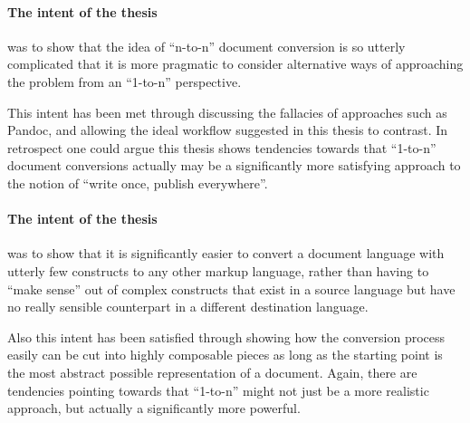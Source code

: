 \documentclass{scrreprt}
\begin{document}
\paragraph{The intent of the thesis}
was to show that the idea of ``n-to-n'' document conversion is so utterly complicated that it is more pragmatic to consider alternative ways of approaching the problem from an ``1-to-n'' perspective.

This intent has been met through discussing the fallacies of approaches such as Pandoc\footnotePandoc{}, and allowing the ideal workflow suggested in this thesis to contrast. In retrospect one could argue this thesis shows tendencies towards that ``1-to-n'' document conversions actually may be a significantly more satisfying approach to the notion of ``write once, publish everywhere''.


\paragraph{The intent of the thesis}
was to show that it is significantly easier to convert a document language with utterly few constructs to any other markup language, rather than having to ``make sense'' out of complex constructs that exist in a source language but have no really sensible counterpart in a different destination language.

Also this intent has been satisfied through showing how the conversion process easily can be cut into highly composable pieces as long as the starting point is the most abstract possible representation of a document. Again, there are tendencies pointing towards that ``1-to-n'' might not just be a more realistic approach, but actually a significantly more powerful.

















%
%
%
%
%
%
\end{document}

